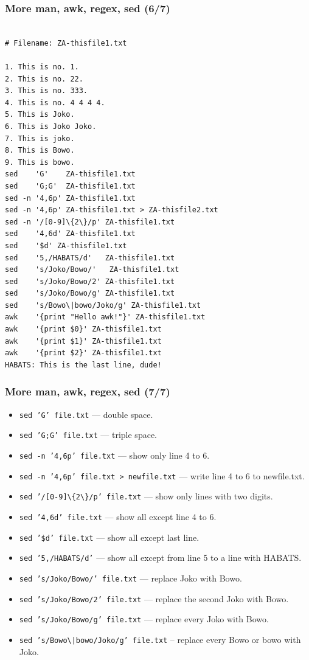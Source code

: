 \documentclass[aspectratio=169, xcolor=table, notheorems, hyperref={pdfpagelabels=false}]{beamer}
\begin{document}
\begin{frame}[fragile]
\frametitle{More man, awk, regex, sed (6/7)}
\begin{lstlisting}[basicstyle=\ttfamily\tiny]

# Filename: ZA-thisfile1.txt

1. This is no. 1.
2. This is no. 22.
3. This is no. 333.  
4. This is no. 4 4 4 4.
5. This is Joko.
6. This is Joko Joko.
7. This is joko.
8. This is Bowo.
9. This is bowo.
sed    'G'    ZA-thisfile1.txt
sed    'G;G'  ZA-thisfile1.txt
sed -n '4,6p' ZA-thisfile1.txt
sed -n '4,6p' ZA-thisfile1.txt > ZA-thisfile2.txt
sed -n '/[0-9]\{2\}/p' ZA-thisfile1.txt
sed    '4,6d' ZA-thisfile1.txt
sed    '$d' ZA-thisfile1.txt
sed    '5,/HABATS/d'   ZA-thisfile1.txt
sed    's/Joko/Bowo/'   ZA-thisfile1.txt
sed    's/Joko/Bowo/2' ZA-thisfile1.txt
sed    's/Joko/Bowo/g' ZA-thisfile1.txt
sed    's/Bowo\|bowo/Joko/g' ZA-thisfile1.txt
awk    '{print "Hello awk!"}' ZA-thisfile1.txt
awk    '{print $0}' ZA-thisfile1.txt
awk    '{print $1}' ZA-thisfile1.txt
awk    '{print $2}' ZA-thisfile1.txt
HABATS: This is the last line, dude!

\end{lstlisting}
\end{frame}


\begin{frame}[fragile]
\frametitle{More man, awk, regex, sed (7/7)}
\begin{itemize}
\item \texttt{sed 'G'    file.txt} --- double space.
\item \texttt{sed 'G;G'  file.txt} --- triple space.
\item \texttt{sed -n '4,6p'  file.txt} --- show only line 4 to 6.
\item \texttt{sed -n '4,6p'  file.txt > newfile.txt} --- write line 4 to 6 to newfile.txt.
\item \texttt{sed '/[0-9]\textbackslash\{2\textbackslash\}/p' file.txt} --- show only lines with two digits. 
\item \texttt{sed '4,6d'     file.txt} --- show all except line 4 to 6.
\item \texttt{sed '\$d'      file.txt} --- show all except last line.
\item \texttt{sed '5,/HABATS/d'} --- show all except from line 5 to a line with HABATS.
\item \texttt{sed 's/Joko/Bowo/'  file.txt} --- replace Joko with Bowo.
\item \texttt{sed 's/Joko/Bowo/2' file.txt} --- replace the second Joko with Bowo.
\item \texttt{sed 's/Joko/Bowo/g' file.txt} --- replace every Joko with Bowo.
\item \texttt{sed 's/Bowo\textbackslash{}|bowo/Joko/g' file.txt} -- replace every Bowo or bowo with Joko.
\end{itemize}
\end{frame}
\end{document}
